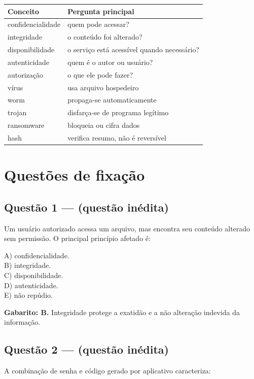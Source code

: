 \documentclass[11pt,a4paper]{article}
\begin{document}
\begin{tabularx}{\linewidth}{lX}
\toprule
 \textbf{Conceito} & \textbf{Pergunta principal} \\
\midrule
 confidencialidade & quem pode acessar? \\
 integridade & o conteúdo foi alterado? \\
 disponibilidade & o serviço está acessível quando necessário? \\
 autenticidade & quem é o autor ou usuário? \\
 autorização & o que ele pode fazer? \\
 vírus & usa arquivo hospedeiro \\
 worm & propaga-se automaticamente \\
 trojan & disfarça-se de programa legítimo \\
 ransomware & bloqueia ou cifra dados \\
 hash & verifica resumo, não é reversível \\
\bottomrule
\end{tabularx}


\section*{Questões de fixação}

\subsection*{Questão 1 — (questão inédita)}

Um usuário autorizado acessa um arquivo, mas encontra seu conteúdo alterado sem permissão. O principal princípio afetado é:

A) confidencialidade. \\ B) integridade. \\ C) disponibilidade. \\ D) autenticidade. \\ E) não repúdio.

\begin{alerta}
\textbf{Gabarito: B.} Integridade protege a exatidão e a não alteração indevida da informação.
\end{alerta}

\subsection*{Questão 2 — (questão inédita)}

A combinação de senha e código gerado por aplicativo caracteriza:
\end{document}
